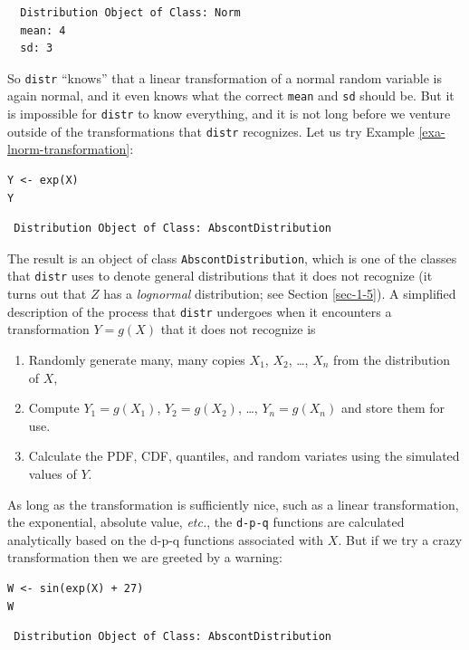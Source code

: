 \documentclass[captions=tableheading]{scrbook}
\begin{document}
\begin{verbatim}
  Distribution Object of Class: Norm
  mean: 4
  sd: 3
\end{verbatim}

So \texttt{distr} ``knows'' that a linear transformation of a normal random variable is again normal, and it even knows what the correct \texttt{mean} and \texttt{sd} should be. But it is impossible for \texttt{distr} to know everything, and it is not long before we venture outside of the transformations that \texttt{distr} recognizes. Let us try Example \ref{exa-lnorm-transformation}:


\lstset{language=R}
\begin{lstlisting}
Y <- exp(X)
Y
\end{lstlisting}

\begin{verbatim}
 Distribution Object of Class: AbscontDistribution
\end{verbatim}

The result is an object of class \texttt{AbscontDistribution}, which is one of the classes that \texttt{distr} uses to denote general distributions that it does not recognize (it turns out that \(Z\) has a \emph{lognormal} distribution; see Section \ref{sec-1-5}). A simplified description of the process that \texttt{distr} undergoes when it encounters a transformation \(Y=g(X)\) that it does not recognize is
\begin{enumerate}
\item Randomly generate many, many copies \(X_{1}\), \(X_{2}\), \ldots{}, \(X_{n}\) from the distribution of \(X\),
\item Compute \(Y_{1}=g(X_{1})\), \(Y_{2}=g(X_{2})\), \ldots{}, \(Y_{n}=g(X_{n})\) and store them for use.
\item Calculate the PDF, CDF, quantiles, and random variates using the simulated values of \(Y\).
\end{enumerate}
As long as the transformation is sufficiently nice, such as a linear transformation, the exponential, absolute value, \emph{etc.}, the \texttt{d-p-q} functions are calculated analytically based on the d-p-q functions associated with \(X\). But if we try a crazy transformation then we are greeted by a warning:


\lstset{language=R}
\begin{lstlisting}
W <- sin(exp(X) + 27)
W
\end{lstlisting}

\begin{verbatim}
 Distribution Object of Class: AbscontDistribution
\end{verbatim}
\end{document}
